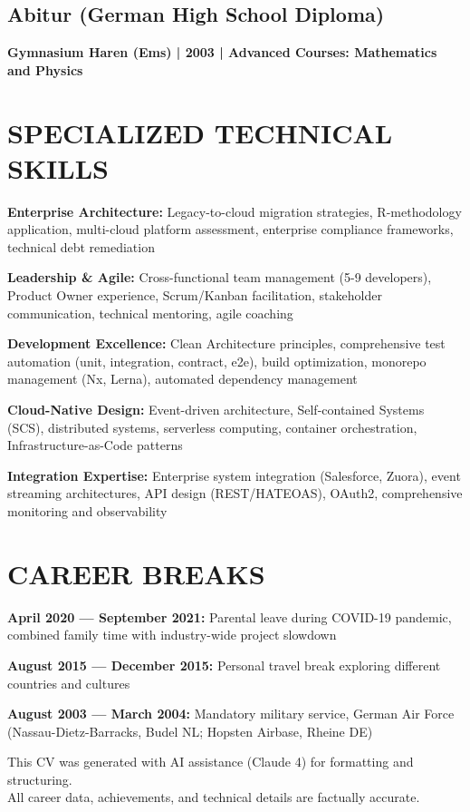 \documentclass[11pt,a4paper]{article}
\begin{document}
\subsection{Abitur (German High School Diploma)}
\textbf{Gymnasium Haren (Ems) | 2003 | Advanced Courses: Mathematics and Physics}

\section{SPECIALIZED TECHNICAL SKILLS}

\textbf{Enterprise Architecture:} Legacy-to-cloud migration strategies, R-methodology application, multi-cloud platform assessment, enterprise compliance frameworks, technical debt remediation

\textbf{Leadership \& Agile:} Cross-functional team management (5-9 developers), Product Owner experience, Scrum/Kanban facilitation, stakeholder communication, technical mentoring, agile coaching

\textbf{Development Excellence:} Clean Architecture principles, comprehensive test automation (unit, integration, contract, e2e), build optimization, monorepo management (Nx, Lerna), automated dependency management

\textbf{Cloud-Native Design:} Event-driven architecture, Self-contained Systems (SCS), distributed systems, serverless computing, container orchestration, Infrastructure-as-Code patterns

\textbf{Integration Expertise:} Enterprise system integration (Salesforce, Zuora), event streaming architectures, API design (REST/HATEOAS), OAuth2, comprehensive monitoring and observability

\section{CAREER BREAKS}

\textbf{April 2020 --- September 2021:} Parental leave during COVID-19 pandemic, combined family time with industry-wide project slowdown

\textbf{August 2015 --- December 2015:} Personal travel break exploring different countries and cultures

\textbf{August 2003 --- March 2004:} Mandatory military service, German Air Force (Nassau-Dietz-Barracks, Budel NL; Hopsten Airbase, Rheine DE)

\vfill

\begin{center}
\footnotesize\color{lightgray}
This CV was generated with AI assistance (Claude 4) for formatting and structuring.\\
All career data, achievements, and technical details are factually accurate.
\end{center}
\end{document}
